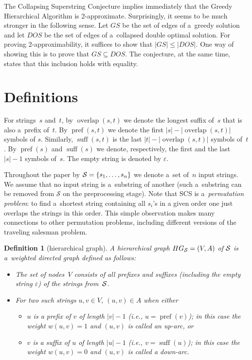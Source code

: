 \documentclass[11pt,letterpaper]{article}
\newtheorem{definition}{Definition}
\DeclareMathOperator{\overlap}{overlap}
\DeclareMathOperator{\pref}{pref}
\DeclareMathOperator{\suff}{suff}
\begin{document}
The Collapsing Superstring Conjecture implies immediately that the Greedy
Hierarchical Algorithm is 2-approximate. Surprisingly, it seems to be much
stronger in the following sense. Let $GS$ be the set of edges of a~greedy
solution and let $DOS$ be the set of edges of a~collapsed double optimal
solution. For proving 2-approximability, it suffices to show that $|GS| \le |DOS|$. 
One way of showing this is to prove that $GS \subseteq DOS$. 
The conjecture, at the same time, states that this inclusion holds with equality.

\section{Definitions}
For strings~$s$ and~$t$, by $\overlap(s,t)$
we denote the longest suffix of~$s$ that is also 
a~prefix of~$t$. By $\pref(s,t)$
we denote the first $|s|-|\overlap(s,t)|$ symbols of $s$.
Similarly, $\suff(s,t)$ is the last
$|t|-|\overlap(s,t)|$ symbols of~$t$. 
By $\pref(s)$ and $\suff(s)$ we denote, respectively,
the first and the last $|s|-1$ symbols of~$s$.
The empty string is denoted by $\varepsilon$.

Throughout the paper by ${\cal S}=\{s_1, \dots, s_n\}$ we denote
a~set of~$n$ input strings. We assume that no input string is a~substring of another (such a~substring can be removed from $\mathcal{S}$ on the preprocessing stage). Note that SCS is a~{\em permutation problem}: to find a~shortest string containing all $s_i$'s in a given order one just
overlaps the strings in this order. This simple observation makes many connections to other permutation problems, including different versions of the traveling salesman problem.

\begin{definition}[hierarchical graph]
  A \emph{hierarchical graph} $HG_{\cal S}=(V,A)$ of ${\cal S}$ is a~weighted directed graph defined as follows:
  \begin{itemize}
  \item The set of nodes~$V$ consists of all prefixes and suffixes (including the empty string $\varepsilon$) of the strings from~${\cal S}$.
  \item For two such strings $u,v \in V$, $(u,v) \in A$ when either 
\begin{itemize}
	\item $u$ is a prefix of $v$ of length $|v|-1$ (i.e., $u=\pref(v)$); in this case the weight $w(u,v)=1$ and $(u,v)$ is called an \emph{up-arc}, or
	\item $v$ is a suffix of $u$ of length $|u|-1$ (i.e., $v=\suff(u)$); in this case the weight $w(u,v)=0$ and $(u,v)$ is called a \emph{down-arc}.
\end{itemize}
  \end{itemize}
\end{definition}
\end{document}
